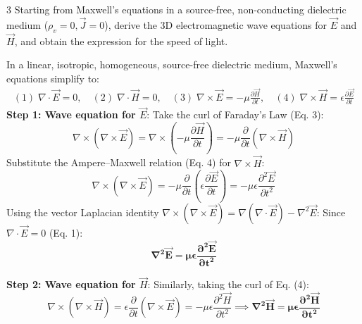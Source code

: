 \vspace{4mm}

\begin{theoryq}{3}
Starting from Maxwell's equations in a source-free, non-conducting dielectric medium ($\rho_v = 0, \vec{J} = 0$), derive the 3D electromagnetic wave equations for $\vec{E}$ and $\vec{H}$, and obtain the expression for the speed of light.
\end{theoryq}
\begin{theorysol}
In a linear, isotropic, homogeneous, source-free dielectric medium, Maxwell's equations simplify to:
\begin{align}
(1)\;\nabla \cdot \vec{E} = 0, \quad (2)\;\nabla \cdot \vec{H} = 0, \quad (3)\;\nabla \times \vec{E} = -\mu\frac{\partial \vec{H}}{\partial t}, \quad (4)\;\nabla \times \vec{H} = \epsilon\frac{\partial \vec{E}}{\partial t}
\end{align}
\textbf{Step 1: Wave equation for $\vec{E}$}:
Take the curl of Faraday's Law (Eq. 3):
\begin{equation}
\nabla \times (\nabla \times \vec{E}) = \nabla \times \left( -\mu \frac{\partial \vec{H}}{\partial t} \right) = -\mu \frac{\partial}{\partial t} (\nabla \times \vec{H})
\end{equation}
Substitute the Ampere--Maxwell relation (Eq. 4) for $\nabla \times \vec{H}$:
\begin{equation}
\nabla \times (\nabla \times \vec{E}) = -\mu \frac{\partial}{\partial t} \left( \epsilon \frac{\partial \vec{E}}{\partial t} \right) = -\mu\epsilon \frac{\partial^2 \vec{E}}{\partial t^2}
\end{equation}
Using the vector Laplacian identity $\nabla \times (\nabla \times \vec{E}) = \nabla(\nabla \cdot \vec{E}) - \nabla^2 \vec{E}$:
Since $\nabla \cdot \vec{E} = 0$ (Eq. 1):
\begin{equation}
\mathbf{\nabla^2 \vec{E} = \mu \epsilon \frac{\partial^2 \vec{E}}{\partial t^2}}
\end{equation}

\textbf{Step 2: Wave equation for $\vec{H}$}:
Similarly, taking the curl of Eq. (4):
\begin{equation}
\nabla \times (\nabla \times \vec{H}) = \epsilon \frac{\partial}{\partial t} (\nabla \times \vec{E}) = -\mu\epsilon \frac{\partial^2 \vec{H}}{\partial t^2} \implies \mathbf{\nabla^2 \vec{H} = \mu \epsilon \frac{\partial^2 \vec{H}}{\partial t^2}}
\end{equation}


\end{theorysol}
